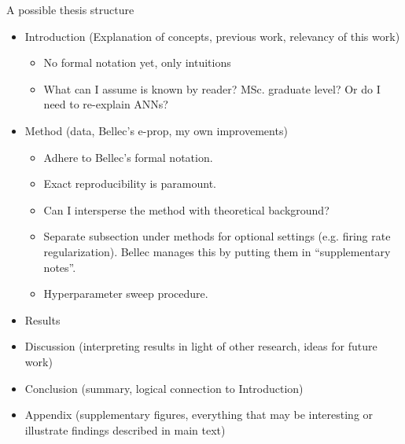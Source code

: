 \documentclass[t]{beamer}
\begin{document}
\footnotesize
\begin{frame}{A possible thesis structure}
  \begin{itemize}[label=--]

    \item Introduction (Explanation of concepts, previous work, relevancy of this work)
    \begin{itemize}[label=--]
    \item No formal notation yet, only intuitions
    \item What can I assume is known by reader? MSc. graduate level? Or do I need to re-explain ANNs?
  	\end{itemize}
  	\item Method (data, Bellec's e-prop, my own improvements)
  	\begin{itemize}[label=--]
    \item Adhere to Bellec's formal notation.
    \item Exact reproducibility is paramount.
    \item Can I intersperse the method with theoretical background?
    \item Separate subsection under methods for optional settings (e.g. firing rate regularization). Bellec manages this by putting them in ``supplementary notes''.
    \item Hyperparameter sweep procedure.
  	\end{itemize}
  	\item Results
  	\item Discussion (interpreting results in light of other research, ideas for future work)
  	\item Conclusion (summary, logical connection to Introduction)
  	\item Appendix (supplementary figures, everything that may be interesting or illustrate findings described in main text)

  \end{itemize}

\end{frame}
\end{document}
